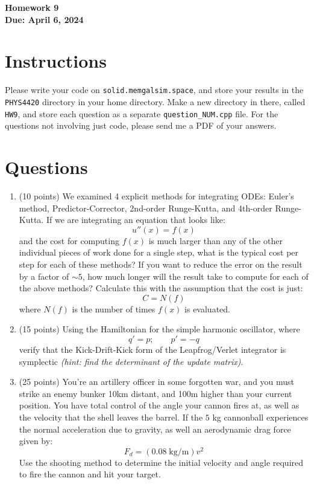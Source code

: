\documentclass[11pt]{article}
\begin{document}
\begin{center}
\textbf{\Large Homework 9}\\
\textbf{Due: April 6, 2024}\\
\end{center}
\section*{Instructions}
Please write your code on \texttt{solid.memgalsim.space}, and store your results
in the \texttt{PHYS4420} directory in your home directory.  Make a new directory
in there, called \texttt{HW9}, and store each question as a separate
\texttt{question\_NUM.cpp} file.  For the questions not involving just code,
please send me a PDF of your answers.


\section*{Questions}
\begin{enumerate}
    \item (10 points)  We examined 4 explicit methods for integrating ODEs:
        Euler's method, Predictor-Corrector, 2nd-order Runge-Kutta, and
        4th-order Runge-Kutta.  If we are integrating an equation that looks
        like:
        $$ u''(x) = f(x) $$
        and the cost for computing $f(x)$ is much larger than any of the other
        individual pieces of work done for a single step, what is the typical
        cost per step for each of these methods?  If you want to reduce the
        error on the result by a factor of $\sim 5$, how much longer will the
        result take to compute for each of the above methods? Calculate this
        with the assumption that the cost is just:
        $$ C = N(f)$$
        where $N(f)$ is the number of times $f(x)$ is evaluated.  
    \item (15 points) Using the Hamiltonian for the simple harmonic oscillator,
        where 
        $$q' = p; \qquad p' = -q$$
        verify that the Kick-Drift-Kick form of the Leapfrog/Verlet integrator
        is symplectic \textit{(hint: find the determinant of the update
        matrix)}.
    \item (25 points) You're an artillery officer in some forgotten war, and you
        must strike an enemy bunker 10km distant, and 100m higher than your
        current position.  You have total control of the angle your cannon fires
        at, as well as the velocity that the shell leaves the barrel.  If the
        $5$ kg cannonball experiences the normal acceleration due to gravity, as well
        an aerodynamic drag force given by:
        $$F_d = (0.08\;\mathrm{kg/m}) v^2 $$
        Use the shooting method to determine the initial velocity and angle
        required to fire the cannon and hit your target.
        
\end{enumerate}
\end{document}
